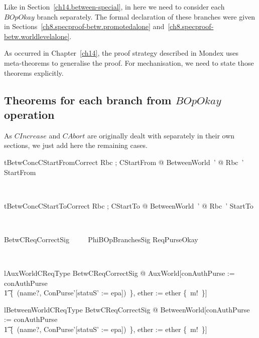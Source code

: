 Like in Section~\ref{ch14.between-special}, in here we need to
consider each $BOpOkay$ branch separately. The formal declaration of
these branches were given in
Sections~\ref{ch8.specproof-betw.promotedalone}
and~\ref{ch8.specproof-betw.worldlevelalone}.

As occurred in Chapter~\ref{ch14}, the proof strategy described in
Mondex uses meta-theorems to generalise the proof. For
mechanisation, we need to state those theorems explicitly.

\subsection{Theorems for each branch from $BOpOkay$ operation}

As $CIncrease$ and $CAbort$ are originally dealt with separately in
their own sections, we just add here the remaining cases.

\begin{LNewThm}
\begin{theorem}{tBetwConcCStartFromCorrect}
    \forall Rbc ; CStartFrom @ \exists BetweenWorld~' @ Rbc~' \land StartFrom %
\end{theorem}~\end{LNewThm}

\begin{LNewThm}
\begin{theorem}{tBetwConcCStartToCorrect}
    \forall Rbc ; CStartTo @ \exists BetweenWorld~' @ Rbc~' \land StartTo %
\end{theorem}~\end{LNewThm}

\begin{LNewSDef}
\begin{zed}
    BetwCReqCorrectSig ~~~~ PhiBOpBranchesSig \land ReqPurseOkay
\end{zed}~\end{LNewSDef}

\begin{theorem}{lAuxWorldCReqType}
    \forall BetwCReqCorrectSig @ AuxWorld[conAuthPurse := conAuthPurse \oplus \\
        \t1 \{~(name?, \theta ConPurse'[statuS' := epa])~\}, ether := ether \cup \{~m!~\}]
\end{theorem}

\begin{theorem}{lBetweenWorldCReqType}
    \forall BetwCReqCorrectSig @ BetweenWorld[conAuthPurse := conAuthPurse \oplus \\
        \t1 \{~(name?, \theta ConPurse'[statuS' := epa])~\}, ether := ether \cup \{~m!~\}]
\end{theorem}

